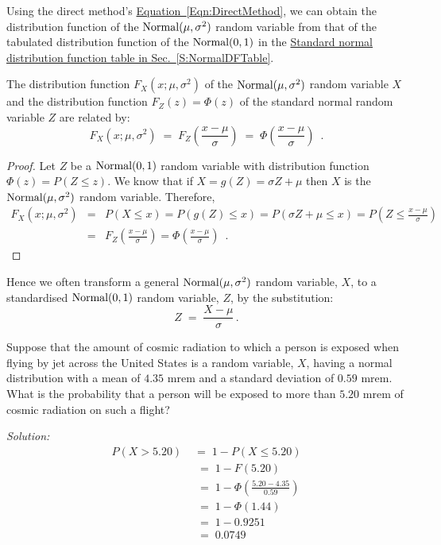 Using the direct method's \hyperref[Eqn:DirectMethod]{Equation~\ref*{Eqn:DirectMethod}}, we can obtain the distribution function of the $\mbox{{\rm Normal}}(\mu,\sigma^2)$ random variable from that of the 
tabulated distribution function of the $\mbox{{\rm Normal}}(0,1)$ in the  \hyperref[S:NormalDFTable]{Standard normal distribution function table in Sec.~\ref*{S:NormalDFTable}}. 
  
\begin{prop}
The distribution function $F_X(x;\mu,\sigma^2)$ of the $\mbox{{\rm Normal}}(\mu,\sigma^2)$ random variable $X$ 
and the distribution function $F_Z(z)=\Phi(z)$  of the standard normal random variable $Z$ are related by:
$$F_X(x;\mu,\sigma^2)\;=\; F_Z\left(\frac{x -\mu}{\sigma}\right) \;=\; \Phi\left(\frac{x-\mu}{\sigma}\right)\enspace .$$

\begin{proof}
Let $Z$ be a $\mbox{{\rm Normal}}(0,1)$ random variable with distribution function $\Phi(z) = P (Z \leq z)$.  
We know that if $X=g(Z)=\sigma Z+\mu$ then $X$ is the $\mbox{{\rm Normal}}(\mu,\sigma^2)$ random variable.  
Therefore, 
\begin{eqnarray*}
F_X(x;\mu,\sigma^2) 
&=& P(X \leq x) = P\left( g(Z) \leq x \right) =  P (\sigma Z+\mu \leq x) = P\left(Z \leq \frac{x -\mu}{\sigma} \right)\\ 
&=& F_Z \left(\frac{x -\mu}{\sigma}\right) = \Phi \left(\frac{x -\mu}{\sigma}\right) \enspace .
\end{eqnarray*}
\end{proof}
\end{prop}

Hence we often transform a general $\mbox{{\rm Normal}}(\mu,\sigma^2)$ random
variable, $X$, to a standardised $\mbox{{\rm Normal}}(0,1)$ random variable, $Z$, by
the substitution:
$$Z\;=\;\frac{X-\mu}{\sigma}\,.$$

\begin{example}\label{EgGaussianProbLocScaleFromTableMremsInFlight}
Suppose that the amount of cosmic radiation to which a person is exposed 
when flying by jet across the United States is a random
variable, $X$, having a normal distribution with a mean of $4.35$ mrem and a
standard deviation of $0.59$ mrem. What is the probability that a person
will be exposed to more than $5.20$ mrem of cosmic radiation on such a
flight?

{\em Solution:}
\begin{align*}
P(X> 5.20)\;&=\;1-P(X\leq
5.20)\\[3pt]&\;=\;1-F(5.20)\\[3pt]&\;=\;1-\Phi\left(\frac{5.20-4.35}{0.59}\right)\\[3pt]&\;=\;1-\Phi(1.44)\\[3pt]&\;=\;1-
0.9251\\[3pt]&\;=\;0.0749
\end{align*}
\end{example}

